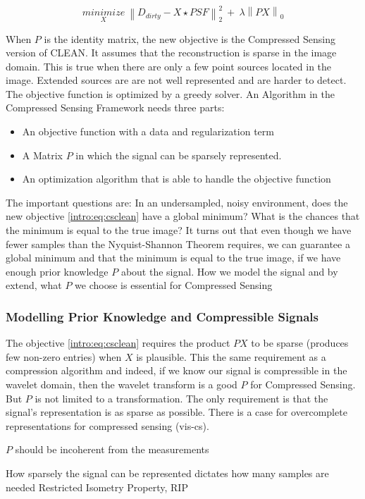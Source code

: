 \begin{equation}\label{intro:eq:csclean}
\underset{X}{minimize} \: \left \| D_{dirty} -X \star PSF \right \|_2^2 \: + \: \lambda \left \| PX \right \|_0
\end{equation}

When $P$ is the identity matrix, the new objective is the Compressed Sensing version of CLEAN. It assumes that the reconstruction is sparse in the image domain. This is true when there are only a few point sources located in the image. Extended sources are are not well represented and are harder to detect. The objective function is optimized by a greedy solver. An Algorithm in the Compressed Sensing Framework needs three parts:
\begin{itemize}
	\item An objective function with a data and regularization term
	\item A Matrix $P$ in which the signal can be sparsely represented.
	\item An optimization algorithm that is able to handle the objective function
\end{itemize}

The important questions are: In an undersampled, noisy environment, does the new objective \eqref{intro:eq:csclean} have a global minimum? What is the chances that the minimum is equal to the true image? It turns out that even though we have fewer samples than the Nyquist-Shannon Theorem requires, we can guarantee a global minimum and that the minimum is equal to the true image, if we have enough prior knowledge $P$ about the signal. How we model the signal and by extend, what $P$ we choose is essential for Compressed Sensing

\subsubsection{Modelling Prior Knowledge and Compressible Signals}
The objective \eqref{intro:eq:csclean} requires the product $PX$ to be sparse (produces few non-zero entries) when $X$ is plausible. This the same requirement as a compression algorithm and indeed, if we know our signal is compressible in the wavelet domain, then the wavelet transform is a good $P$ for Compressed Sensing. But $P$ is not limited to a transformation. The only requirement is that the signal's representation is as sparse as possible. There is a case for overcomplete representations for compressed sensing (vis-cs). 

$P$ should be incoherent from the measurements

How sparsely the signal can be represented dictates how many samples are needed Restricted Isometry Property, RIP 

